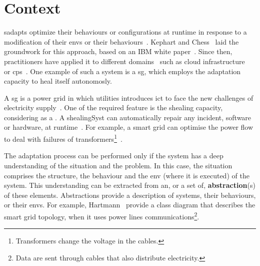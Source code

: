\section{Context}

\Glspl{sadapt} optimize their \glspl{behaviour} or configurations at runtime in response to a modification of their \glspl{env} or their \glspl{behaviour}~\cite{DBLP:conf/dagstuhl/ChengLGIMABBBCSDFGGGKKKLMMMPSTTWW09}.
Kephart and Chess~\cite{DBLP:journals/computer/KephartC03} laid the groundwork for this approach, based on an IBM white paper~\cite{computing2006architectural}.
Since then, practitioners have applied it to different domains~\cite{DBLP:journals/corr/abs-1904-01518} such as cloud infrastructure~\cite{DBLP:conf/icac/JavadiG17, OpenStack:Watcher:Wiki, DBLP:conf/icse/BarnaKFL17} or \gls{cps}~\cite{DBLP:conf/icac/LalandaGC17, DBLP:conf/cbse/FouquetMFBPJ12, DBLP:conf/smartgridsec/0001FKNT14}.
One example of such a system is a \gls{sg}, which employs the adaptation capacity to heal itself autonomosly.

A \gls{sg} is a power grid in which utilities introduces \gls{ict} to face the new challenges of electricity supply~\cite{farhangi2010path, ipakchi2009grid, DBLP:journals/comsur/FangMXY12}.
One of the required feature is the \gls{shealing} capacity, considering as a .
A \gls{shealingSyst} can automatically repair any incident, software or hardware, at runtime~\cite{DBLP:journals/computer/KephartC03}.
For example, a smart grid can optimise the power flow to deal with failures of transformers\footnote{Transformers change the voltage in the cables.}~\cite{DBLP:journals/comsur/FangMXY12}.

The adaptation process can be performed only if the system has a deep understanding of the situation and the problem.
In this case, the situation comprises the \gls{structure}, the \gls{behaviour} and the \gls{env} (where it is executed) of the system.
This understanding can be extracted from an, or a set of, \textbf{abstraction}(s) of these elements.
Abstractions provide a description of systems, their \glspl{behaviour}, or their \glspl{env}.
For example, Hartmann~\etal \cite{DBLP:conf/smartgridcomm/0001FKTPTR14} provide a class diagram that describes the smart grid topology, when it uses power lines communications\footnote{Data are sent through cables that also distribute electricity.}.

